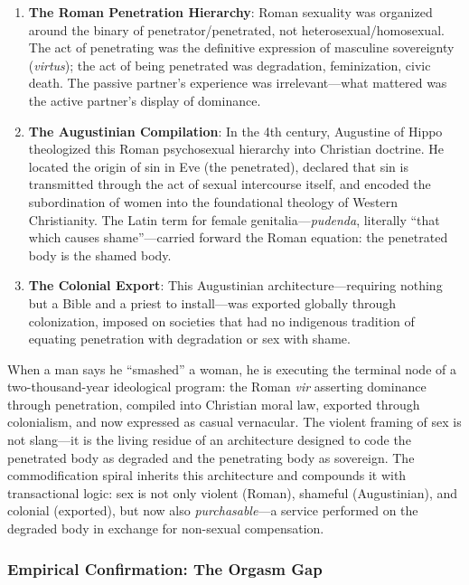 \documentclass[12pt, letterpaper]{article}
\begin{document}
\begin{enumerate}
    \item \textbf{The Roman Penetration Hierarchy}: Roman sexuality was organized around the binary of penetrator/penetrated, not heterosexual/homosexual. The act of penetrating was the definitive expression of masculine sovereignty (\textit{virtus}); the act of being penetrated was degradation, feminization, civic death. The passive partner's experience was irrelevant---what mattered was the active partner's display of dominance.
    
    \item \textbf{The Augustinian Compilation}: In the 4th century, Augustine of Hippo theologized this Roman psychosexual hierarchy into Christian doctrine. He located the origin of sin in Eve (the penetrated), declared that sin is transmitted through the act of sexual intercourse itself, and encoded the subordination of women into the foundational theology of Western Christianity. The Latin term for female genitalia---\textit{pudenda}, literally ``that which causes shame''---carried forward the Roman equation: the penetrated body is the shamed body.
    
    \item \textbf{The Colonial Export}: This Augustinian architecture---requiring nothing but a Bible and a priest to install---was exported globally through colonization, imposed on societies that had no indigenous tradition of equating penetration with degradation or sex with shame.
\end{enumerate}

When a man says he ``smashed'' a woman, he is executing the terminal node of a two-thousand-year ideological program: the Roman \textit{vir} asserting dominance through penetration, compiled into Christian moral law, exported through colonialism, and now expressed as casual vernacular. The violent framing of sex is not slang---it is the living residue of an architecture designed to code the penetrated body as degraded and the penetrating body as sovereign. The commodification spiral inherits this architecture and compounds it with transactional logic: sex is not only violent (Roman), shameful (Augustinian), and colonial (exported), but now also \textit{purchasable}---a service performed on the degraded body in exchange for non-sexual compensation.

\subsubsection{Empirical Confirmation: The Orgasm Gap}
\end{document}
